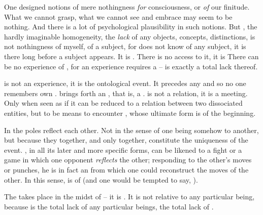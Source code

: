 One designed notions of mere nothingness {\em for} consciousness, or {\em of} our
finitude.  What we cannot grasp, what we cannot see and embrace may seem to be
nothing.  And there is a lot of psychological plausibility in such notions.  But
, the hardly imaginable  homogeneity, the {\em
  lack} of any objects, concepts, distinctions, is not nothingness of myself, of
a subject, for  does not know of any subject, it is there long
before a subject appears.  It is .  There is no access to it, it is
 There can be no
experience of , for an experience requires a  --
 is exactly a total lack thereof.

\pa\label{pa:imago}  is not an experience, it is the ontological
event. It precedes any  and so no one remembers own .
 brings forth an , that is, a .
 is not a relation, it is a meeting. Only when seen as if
 it can be reduced to a relation between two dissociated
entities, but to be  means to encounter , whose
ultimate form is  of the beginning.

In  the  poles reflect each other. Not in the
sense of one being somehow  to another, but because they together,
and only together, constitute the uniqueness of the event.  ,
in all its later and more specific forms, can be likened to a fight or a game in
which one opponent {\em reflects} the other; responding to the other's moves
or punches, he is in fact an  from which one could reconstruct the
moves of the other.
In this sense,  is  of  (and one would
be tempted to say, ).

\pa The   takes place in the midst of
 -- it is . It is not relative to any particular
being, because  is the total lack of any particular beings, the
total lack of .

